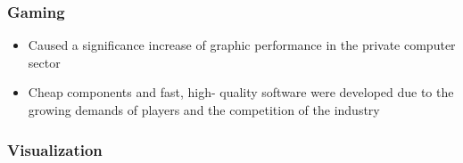 \documentclass[12pt]{article}
\begin{document}
\subsubsection*{Gaming}
\begin{itemize}
	\item Caused a significance increase of graphic performance in the private computer sector
	\item Cheap components and fast, high- quality software were developed due to the growing demands of players and the competition of the industry
\end{itemize}

\subsubsection*{Visualization}
\end{document}

